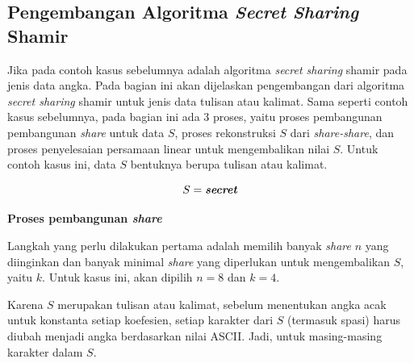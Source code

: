 \subsection{Pengembangan Algoritma \textit{Secret Sharing} Shamir}

Jika pada contoh kasus sebelumnya adalah algoritma \textit{secret sharing} shamir pada jenis data angka. Pada bagian ini akan dijelaskan pengembangan dari algoritma \textit{secret sharing} shamir untuk jenis data tulisan atau kalimat. Sama seperti contoh kasus sebelumnya, pada bagian ini ada 3 proses, yaitu proses pembangunan pembangunan \textit{share} untuk data \begin{math}S\end{math}, proses rekonstruksi \begin{math}S\end{math} dari \textit{share-share}, dan proses penyelesaian persamaan linear untuk mengembalikan nilai \begin{math}S\end{math}. Untuk contoh kasus ini, data \begin{math}S\end{math} bentuknya berupa tulisan atau kalimat.

\begin{displaymath}
	S = \text{\textbf{\textit{secret}}}
\end{displaymath}

\begin{flushleft}
	\textbf{Proses pembangunan \textit{share}}
\end{flushleft}

Langkah yang perlu dilakukan pertama adalah memilih banyak \textit{share} \begin{math}n\end{math} yang diinginkan dan banyak minimal \textit{share} yang diperlukan untuk mengembalikan \begin{math}S\end{math}, yaitu \begin{math}k\end{math}. Untuk kasus ini, akan dipilih \begin{math}n=8\end{math} dan \begin{math}k=4\end{math}.

Karena \begin{math}S\end{math} merupakan tulisan atau kalimat, sebelum menentukan angka acak untuk konstanta setiap koefesien, setiap karakter dari \begin{math}S\end{math} (termasuk spasi) harus diubah menjadi angka berdasarkan nilai ASCII. Jadi, untuk masing-masing karakter dalam \begin{math}S\end{math}.

